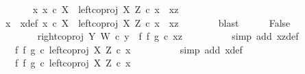 \begin{isabellebody}
\ \ \ \ \isamarkupfalse%
\ {\isachardoublequoteopen}{\isasymexists}\ x{\isachardot}{\kern0pt}\ x\ {\isasymin}\isactrlsub c\ X\ {\isasymand}\ left{\isacharunderscore}{\kern0pt}coproj\ X\ Z\ {\isasymcirc}\isactrlsub c\ x\ {\isacharequal}{\kern0pt}\ xz{\isachardoublequoteclose}\isanewline
\ \ \ \ \isamarkupfalse%
\ \isamarkupfalse%
\ x\ \ x{\isacharunderscore}{\kern0pt}def{\isacharcolon}{\kern0pt}\ {\isachardoublequoteopen}x\ {\isasymin}\isactrlsub c\ X\ {\isasymand}\ left{\isacharunderscore}{\kern0pt}coproj\ X\ Z\ {\isasymcirc}\isactrlsub c\ x\ {\isacharequal}{\kern0pt}\ xz{\isachardoublequoteclose}\isanewline
\ \ \ \ \ \ \isamarkupfalse%
\ blast\isanewline
\ \ \ \ \isamarkupfalse%
\ False\isanewline
\ \ \ \ \isamarkupfalse%
\ {\isacharminus}{\kern0pt}\ \isanewline
\ \ \ \ \ \ \isamarkupfalse%
\ {\isachardoublequoteopen}right{\isacharunderscore}{\kern0pt}coproj\ Y\ W\ {\isasymcirc}\isactrlsub c\ y\ {\isacharequal}{\kern0pt}\ {\isacharparenleft}{\kern0pt}f\ {\isasymbowtie}\isactrlsub f\ g{\isacharparenright}{\kern0pt}\ {\isasymcirc}\isactrlsub c\ xz{\isachardoublequoteclose}\isanewline
\ \ \ \ \ \ \ \ \isamarkupfalse%
\ {\isacharparenleft}{\kern0pt}simp\ add{\isacharcolon}{\kern0pt}\ xz{\isacharunderscore}{\kern0pt}def{\isacharparenright}{\kern0pt}\isanewline
\ \ \ \ \ \ \isamarkupfalse%
\ \isamarkupfalse%
\ {\isachardoublequoteopen}{\isachardot}{\kern0pt}{\isachardot}{\kern0pt}{\isachardot}{\kern0pt}\ {\isacharequal}{\kern0pt}\ {\isacharparenleft}{\kern0pt}f\ {\isasymbowtie}\isactrlsub f\ g{\isacharparenright}{\kern0pt}\ {\isasymcirc}\isactrlsub c\ left{\isacharunderscore}{\kern0pt}coproj\ X\ Z\ {\isasymcirc}\isactrlsub c\ x{\isachardoublequoteclose}\isanewline
\ \ \ \ \ \ \ \ \isamarkupfalse%
\ {\isacharparenleft}{\kern0pt}simp\ add{\isacharcolon}{\kern0pt}\ x{\isacharunderscore}{\kern0pt}def{\isacharparenright}{\kern0pt}\isanewline
\ \ \ \ \ \ \isamarkupfalse%
\ \isamarkupfalse%
\ {\isachardoublequoteopen}{\isachardot}{\kern0pt}{\isachardot}{\kern0pt}{\isachardot}{\kern0pt}\ {\isacharequal}{\kern0pt}\ {\isacharparenleft}{\kern0pt}{\isacharparenleft}{\kern0pt}f\ {\isasymbowtie}\isactrlsub f\ g{\isacharparenright}{\kern0pt}\ {\isasymcirc}\isactrlsub c\ left{\isacharunderscore}{\kern0pt}coproj\ X\ Z{\isacharparenright}{\kern0pt}\ {\isasymcirc}\isactrlsub c\ x{\isachardoublequoteclose}\isanewline
\ \ \ \ \ \ \ \ \isamarkupfalse%

\end{isabellebody}
